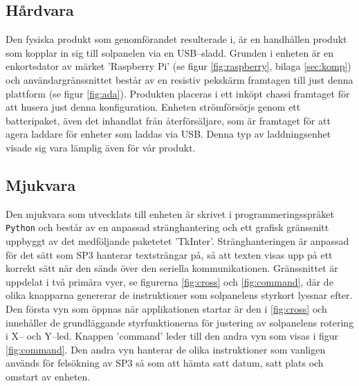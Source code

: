 \documentclass{article}
\begin{document}
        \subsection{Hårdvara} %
        \label{sub:h_rdvara}
        Den fysiska produkt som genomförandet resulterade i, är en handhållen produkt som kopplar in sig till sol\-panel\-en via en USB--sladd. Grunden i enheten är en enkorts\-dator av märket 'Raspberry Pi' (se figur \ref{fig:raspberry}, bilaga \ref{sec:komp}) och användargränssnittet består av en resistiv pekskärm framtagen till just denna plattform \cite{Ada} (se figur \ref{fig:ada}). Produkten placeras i ett inköpt chassi framtaget för att husera just denna konfiguration. Enheten strömförsörjs genom ett batteripaket, även det inhandlat från återförsäljare, som är framtaget för att agera laddare för enheter som laddas via USB. Denna typ av laddningsenhet visade sig vara lämplig även för vår produkt.

        \subsection{Mjukvara} %
        \label{sub:mjukvara}
         Den mjukvara som utvecklats till enheten är skrivet i programmeringsspråket \texttt{Python} och består av en anpassad stränghantering och ett grafisk gränssnitt uppbyggt av det medföljande paketetet 'TkInter'. Stränghanteringen är anpassad för det sätt som SP3 hanterar textsträngar på, så att texten visas upp på ett korrekt sätt när den sänds över den seriella kommunikationen. Gränssnittet är uppdelat i två primära vyer, se figurerna \ref{fig:cross} och \ref{fig:command}, där de olika knapparna genererar de instruktioner som solpanelens styrkort lyssnar efter. \\

        \noindent Den första vyn som öppnas när applikationen startar är den i \ref{fig:cross} och innehåller de grund\-läggande styrfunktionerna för justering av solpanelens rotering i X-- och Y--led. Knappen 'command' leder till den andra vyn som visas i figur \ref{fig:command}. Den andra vyn hanterar de olika instruktioner som vanligen används för felsökning av SP3 så som att hämta satt datum, satt plats och omstart av enheten.
      
\end{document}
